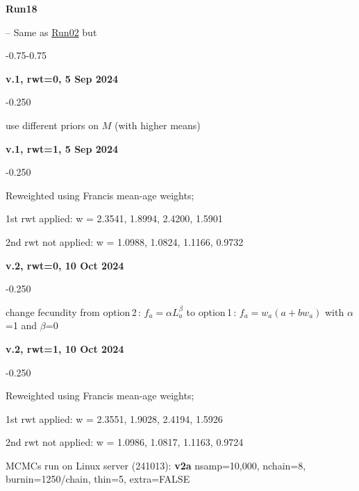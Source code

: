 \hypertarget{R18}{\textbf{Run18}} -- Same as \hyperlink{R02}{Run02} but
\begin{itemize_csas}{-0.75}{-0.75}
	\item \textbf{v.1, rwt=0, 5 Sep 2024}
	\begin{itemize_csas}{-0.25}{0}
		\item use different priors on $M$ (with higher means)
	\end{itemize_csas}
	\item \textbf{v.1, rwt=1, 5 Sep 2024}
	\begin{itemize_csas}{-0.25}{0}
		\item Reweighted using Francis mean-age weights;
		\item 1st rwt applied: w = 2.3541, 1.8994, 2.4200, 1.5901
		\item 2nd rwt not applied: w = 1.0988, 1.0824, 1.1166, 0.9732
	\end{itemize_csas}
	\item \textbf{v.2, rwt=0, 10 Oct 2024}
	\begin{itemize_csas}{-0.25}{0}
		\item change fecundity from option\,2\,: $f_a = \alpha L_a^{\beta}$ to option\,1\,:  $f_a = w_a (a + b w_a)$ with $\alpha$=1 and $\beta$=0
	\end{itemize_csas}
	\item \textbf{v.2, rwt=1, 10 Oct 2024}
	\begin{itemize_csas}{-0.25}{0}
		\item Reweighted using Francis mean-age weights;
		\item 1st rwt applied: w = 2.3551, 1.9028, 2.4194, 1.5926
		\item 2nd rwt not applied: w = 1.0986, 1.0817, 1.1163, 0.9724
		\item MCMCs run on Linux server (241013): \textbf{v2a} nsamp=10,000, nchain=8, burnin=1250/chain, thin=5, extra=FALSE
	\end{itemize_csas}
\end{itemize_csas}

